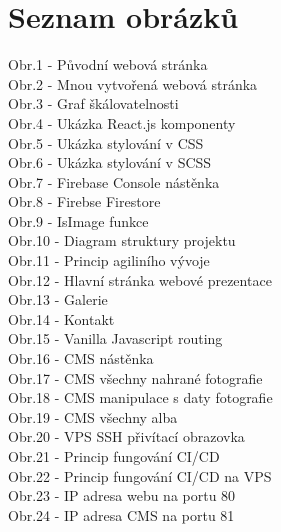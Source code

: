 \documentclass[12pt,a4paper]{report}
\begin{document}
  \chapter{Seznam obrázků}
  \noindent Obr.1 - Původní webová stránka  \\
  \noindent Obr.2 - Mnou vytvořená webová stránka  \\ 
  \noindent Obr.3 - Graf škálovatelnosti  \\
  \noindent Obr.4 - Ukázka React.js komponenty  \\ 
  \noindent Obr.5 - Ukázka stylování v CSS  \\
  \noindent Obr.6 - Ukázka stylování v SCSS  \\ 
  \noindent Obr.7 - Firebase Console nástěnka  \\
  \noindent Obr.8 - Firebse Firestore  \\ 
  \noindent Obr.9 - IsImage funkce  \\ 
  \noindent Obr.10 - Diagram struktury projektu  \\ 
  \noindent Obr.11 - Princip agiliního vývoje  \\
  \noindent Obr.12 - Hlavní stránka webové  prezentace  \\
  \noindent Obr.13 - Galerie  \\
  \noindent Obr.14 - Kontakt  \\ 
  \noindent Obr.15 - Vanilla Javascript routing  \\ 
  \noindent Obr.16 - CMS nástěnka  \\
  \noindent Obr.17 - CMS všechny nahrané fotografie  \\
  \noindent Obr.18 - CMS manipulace s daty fotografie  \\
  \noindent Obr.19 - CMS všechny alba  \\
  \noindent Obr.20 - VPS SSH přivítací obrazovka  \\
  \noindent Obr.21 - Princip fungování CI/CD  \\
  \noindent Obr.22 - Princip fungování CI/CD na VPS  \\
  \noindent Obr.23 - IP adresa webu na portu 80  \\
  \noindent Obr.24 - IP adresa CMS na portu 81  \\
 
\end{document}
